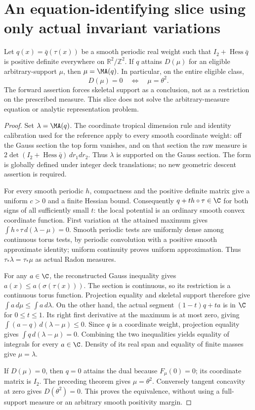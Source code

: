 \section{An equation-identifying slice using only actual invariant variations}
\begin{theorem}\label{fresh:toric-attainment}
Let $q(x)=\bar q(\tau(x))$ be a smooth periodic real weight such that
$I_2+\operatorname{Hess}\bar q$ is positive definite everywhere on
$\mathbb R^2/\mathbb Z^2$. If $q$ attains $D(\mu)$ for an eligible
arbitrary-support $\mu$, then $\mu=\MA(q)$. In particular, on the
entire eligible class,
\[
 D(\mu)=0\quad\Longleftrightarrow\quad\mu=\theta^2.
\]
The forward assertion forces skeletal support as a conclusion, not
as a restriction on the prescribed measure. This slice does not solve
the arbitrary-measure equation or analytic representation problem.
\end{theorem}
\begin{proof}
Set $\lambda=\MA(q)$. The coordinate tropical dimension rule and
identity calibration used for the reference apply to every smooth
coordinate weight: off the Gauss section the top form vanishes, and
on that section the raw measure is
$2\det(I_2+\operatorname{Hess}\bar q)\,dr_1dr_2$.
Thus $\lambda$ is supported on the Gauss section. The form is globally
defined under integer deck translations; no new geometric descent
assertion is required.

For every smooth periodic $h$, compactness and the positive definite
matrix give a uniform $c>0$ and a finite Hessian bound. Consequently
$q+th\circ\tau\in\C$ for both signs of all sufficiently small $t$:
the local potential is an ordinary smooth convex coordinate function.
First variation at the attained maximum gives
$\int h\circ\tau\,d(\lambda-\mu)=0$.
Smooth periodic tests are uniformly dense among continuous torus
tests, by periodic convolution with a positive smooth approximate
identity; uniform continuity proves uniform approximation.
Thus $\tau_*\lambda=\tau_*\mu$ as actual Radon measures.

For any $a\in\C$, the reconstructed Gauss inequality gives
$a(x)\le a(\sigma(\tau(x)))$. The section is continuous, so its
restriction is a continuous torus function. Projection equality and
skeletal support therefore give $\int a\,d\mu\le\int a\,d\lambda$.
On the other hand, the actual segment $(1-t)q+ta$ is in $\C$ for
$0\le t\le1$. Its right first derivative at the maximum is at most
zero, giving
$\int(a-q)\,d(\lambda-\mu)\le0$. Since $q$ is a coordinate weight,
projection equality gives $\int q\,d(\lambda-\mu)=0$.
Combining the two inequalities yields equality of integrals for every
$a\in\C$. Density of its real span and equality of finite masses
give $\mu=\lambda$.

If $D(\mu)=0$, then $q=0$ attains the dual because $F_\mu(0)=0$;
its coordinate matrix is $I_2$. The preceding theorem gives
$\mu=\theta^2$. Conversely tangent concavity at zero gives
$D(\theta^2)=0$. This proves the equivalence, without using a
full-support measure or an arbitrary smooth positivity margin.
\end{proof}

